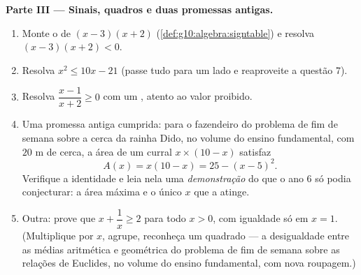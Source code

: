 \begin{problem}[{Problema de fim de semana --- problemas de soma e
produto, completar o quadrado como al-Khwarizmi o desenhou, e a
equação $x^2 = x + 1$}]
\medskip
\noindent\textbf{Parte III --- Sinais, quadros e duas promessas
antigas.}
\begin{enumerate}[resume]
  \item Monte o  de $(x - 3)(x + 2)$
        (\cref{def:g10:algebra:signtable}) e resolva
        $(x - 3)(x + 2) < 0$.
  \item Resolva $x^2 \leq 10x - 21$ (passe tudo para um lado e
        reaproveite a questão 7).
  \item Resolva $\dfrac{x - 1}{x + 2} \geq 0$ com um , atento ao valor proibido.
  \item Uma promessa antiga cumprida: para o fazendeiro do
        problema de fim de semana sobre a cerca da rainha Dido,
        no volume do ensino fundamental, com $20$ m de cerca, a
        área de um curral $x \times (10 - x)$ satisfaz
        \[
        A(x) = x(10 - x) = 25 - (x - 5)^2 .
        \]
        Verifique a identidade e leia nela uma
        \emph{demonstração} do que o ano 6 só podia conjecturar:
        a área máxima e o único $x$ que a atinge.
  \item Outra: prove que $x + \dfrac1x \geq 2$ para todo
        $x > 0$, com igualdade só em $x = 1$. (Multiplique por
        $x$, agrupe, reconheça um quadrado --- a desigualdade
        entre as médias aritmética e geométrica do problema de
        fim de semana sobre as relações de Euclides, no volume do
        ensino fundamental, com nova roupagem.)
\end{enumerate}


\end{problem}
